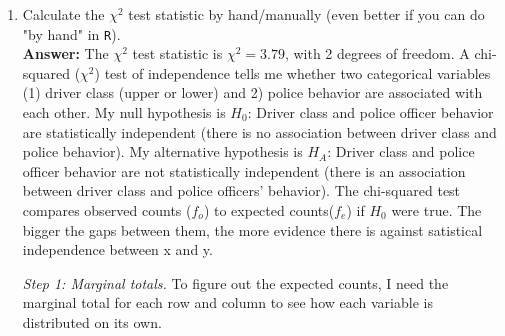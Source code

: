 \documentclass[12pt,letterpaper]{article}
\begin{document}
\begin{enumerate}
	
	\item [(a)]
	Calculate the $\chi^2$ test statistic by hand/manually (even better if you can do "by hand" in \texttt{R}).\\
	
	\noindent \textbf{Answer:} The $\chi^2$ test statistic is $\chi^2 = 3.79$, with 2 degrees of freedom.
	\noindent A chi-squared ($\chi^2$) test of independence tells me whether two categorical variables (1) driver class (upper or lower) and 2) police behavior are associated with each other. My null hypothesis is $H_0$: Driver class and police officer behavior are statistically independent (there is no association between driver class and police behavior). My alternative hypothesis is $H_A$: Driver class and police officer behavior are not statistically independent (there is an association between driver class and police officers’ behavior).
	\noindent The chi-squared test compares observed counts ($f_o$) to expected counts($f_e$) if $H_0$ were true. The bigger the gaps between them, the more evidence there is against satistical independence between x and y. 
	
	\noindent \textit{Step 1: Marginal totals.} To figure out the expected counts, I need the marginal total for each row and column to see how each variable is distributed on its own. 
	

\end{enumerate}
\end{document}
